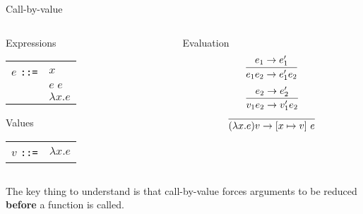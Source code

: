 %
\begin{frame}{Call-by-value}

\begin{columns}
\begin{column}{0.4\textwidth}

\begin{block}{Expressions}
\begin{tabular}{ll}
$e$ \texttt{::=} & $x$              \\
                 & $e \; e$         \\
                 & $\lambda x . e$  \\
\end{tabular}
\end{block}

\begin{block}{Values}
\begin{tabular}{ll}
$v$ \texttt{::=} & $\lambda x . e$  \\
\end{tabular}
\end{block}

\end{column}
\begin{column}{0.4\textwidth}

\begin{block}{Evaluation}
\[
\infer{e_1 e_2 \to e_1' e_2}{e_1 \to e_1'}
\]
\[
\infer{v_1 e_2 \to v_1' e_2}{e_2 \to e_2'}
\]
\[
\infer{(\lambda x . e) v \to \left[x \mapsto v \right] \, e}{}
\]
\end{block}

\end{column}
\end{columns}

The key thing to understand is that call-by-value forces arguments to be reduced
\textbf{before} a function is called.

\end{frame}

